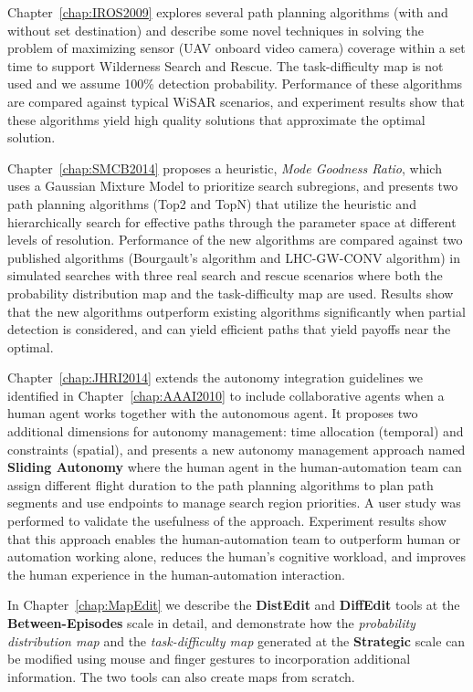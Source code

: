 Chapter~\ref{chap:IROS2009} explores several path planning algorithms (with and without set destination) and describe some novel techniques in solving the problem of maximizing sensor (UAV onboard video camera) coverage within a set time to support Wilderness Search and Rescue. The task-difficulty map is not used and we assume 100\% detection probability. Performance of these algorithms are compared against typical WiSAR scenarios, and experiment results show that these algorithms yield high quality solutions that approximate the optimal solution.

Chapter~\ref{chap:SMCB2014} proposes a heuristic, \textit{Mode Goodness Ratio}, which uses a Gaussian Mixture Model to prioritize search subregions, and presents two path planning algorithms (Top2 and TopN) that utilize the heuristic and hierarchically search for effective paths through the parameter space at different levels of resolution. Performance of the new algorithms are compared against two published algorithms (Bourgault's algorithm and LHC-GW-CONV algorithm) in simulated searches with three real search and rescue scenarios where both the probability distribution map and the task-difficulty map are used. Results show that the new algorithms outperform existing algorithms significantly when partial detection is considered, and can yield efficient paths that yield payoffs near the optimal. 

Chapter~\ref{chap:JHRI2014} extends the autonomy integration guidelines we identified in Chapter~\ref{chap:AAAI2010} to include collaborative agents when a human agent works together with the autonomous agent. It proposes two additional dimensions for autonomy management: time allocation (temporal) and constraints (spatial), and presents a new autonomy management approach named \textbf{Sliding Autonomy} where the human agent in the human-automation team can assign different flight duration to the path planning algorithms to plan path segments and use endpoints to manage search region priorities. A user study was performed to validate the usefulness of the approach. Experiment results show that this approach enables the human-automation team to outperform human or automation working alone, reduces the human's cognitive workload, and improves the human experience in the human-automation interaction.

In Chapter~\ref{chap:MapEdit} we describe the \textbf{DistEdit} and \textbf{DiffEdit} tools at the \textbf{Between-Episodes} scale in detail, and demonstrate how the \textit{probability distribution map} and the \textit{task-difficulty map} generated at the \textbf{Strategic} scale can be modified using mouse and finger gestures to incorporation additional information. The two tools can also create maps from scratch.

